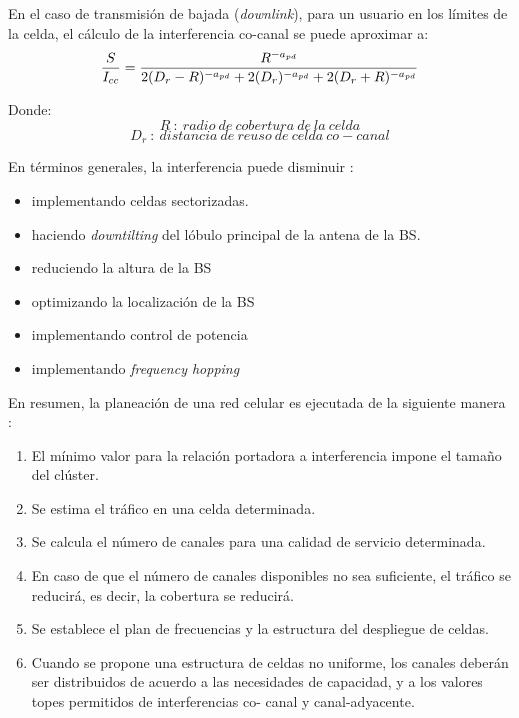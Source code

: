 En el caso de transmisión de bajada (\textit{downlink}), para un usuario en los límites de la celda, el cálculo de la interferencia co-canal se puede aproximar a:\newline
\begin{equation}
    \frac{S}{I_{cc}}=\frac{R^{-a_{pd}}}{ 2(D_{r}-R)^{-a_{pd}}+2(D_{r})^{-a_{pd}} + 2(D_{r}+R)^{-a_{pd}}}\\
    \label{eqn:SIcc}
\end{equation}

Donde:
\[R\ :\ radio\ de\ cobertura\ de\ la\ celda\] 
\[D_{r}\ :\ distancia\ de\ reuso\ de\ celda\ co-canal\] 

En términos generales, la interferencia puede disminuir \parencite{Correia2018}:
\begin{itemize}
    \item implementando celdas sectorizadas.
    \item haciendo \textit{downtilting} del lóbulo principal de la antena de la BS.
    \item reduciendo la altura de la BS
    \item optimizando la localización de la BS
    \item implementando control de potencia
    \item implementando \textit{frequency hopping }
\end{itemize}

En resumen, la planeación de una red celular es ejecutada de la siguiente manera \parencite{Correia2018}:
\begin{enumerate}
    \item El mínimo valor para la relación portadora a interferencia impone el tamaño del clúster.
    \item Se estima el tráfico en una celda determinada.
    \item Se calcula el número de canales para una calidad de servicio determinada.
    \item En caso de que el número de canales disponibles no sea suficiente, el tráfico se reducirá, es decir, la cobertura se reducirá.
    \item Se establece el plan de frecuencias y la estructura del despliegue de celdas.
    \item Cuando se propone una estructura de celdas no uniforme, los canales deberán ser distribuidos de acuerdo a las necesidades de capacidad, y a los valores topes permitidos de interferencias co- canal y canal-adyacente.
\end{enumerate}
